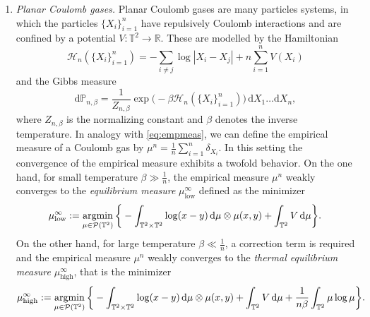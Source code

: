 \documentclass[11pt,a4paper,oneside]{amsart}
\numberwithin{equation}{section}
\begin{document}
\begin{enumerate}
%

\medskip
\item \emph{Planar Coulomb gases. }Planar Coulomb gases are many  particles systems, in which the particles $\{X_i\}_{i=1}^n$ have repulsively Coulomb interactions and are confined by a potential $V: \mathbb{T}^2 \rightarrow \mathbb{R}$. These are modelled by the Hamiltonian
\begin{equation}\label{eq:hamiltonian}
\mathcal{H}_n(\{X_i\}_{i=1}^n) = - \sum_{i \neq j} \log |X_i - X_j| + n \sum_{i=1}^n V(X_i)
\end{equation}
and the Gibbs measure
\begin{equation}\label{eq:gibbsmeasure}
\mathrm{d}\mathbb{P}_{n, \beta} = \frac 1{Z_{n,\beta}} \exp\big(- \beta \mathcal{H}_n  (\{X_i\}_{i=1}^n)\big)\, \mathrm{d}X_1 \dots \mathrm{d}X_n,
\end{equation}
where $Z_{n,\beta}$ is the normalizing constant and $\beta$ denotes the inverse temperature.  In analogy with \eqref{eq:empmeas}, we can define the empirical measure of a Coulomb gas by $\mu^n = \frac1n \sum_{i=1}^n \delta_{X_i}$. In this setting the convergence of the empirical measure exhibits a twofold behavior.  On the one hand, for small temperature $\beta \gg \frac1n$, the empirical measure $\mu^n$ weakly converges to the \emph{equilibrium measure} $\mu^\infty_{\text{low}}$ defined as the minimizer
%
$$\mu^\infty_{\text{low}} := \operatornamewithlimits{argmin}_{\mu \in \mathcal{P}(\mathbb{T}^2)} \bigg\{ - \int_{\mathbb{T}^2\times \mathbb{T}^2} \log (x-y) \,\mathrm{d}\mu \otimes \mu (x,y) + \int_{\mathbb{T}^2} V \,\mathrm{d}\mu\bigg\}. $$
%
On the other hand, for large temperature $\beta\ll \frac{1}{n}$, a correction term is required and the empirical measure $\mu^n$ weakly converges to the \emph{thermal equilibrium measure} $\mu^\infty_{\text{high}}$, that is the minimizer
%
\begin{equation*}
%
\mu^\infty_{\text{high}} :=\operatornamewithlimits{argmin}_{\mu \in \mathcal{P}(\mathbb{T}^2)} \bigg\{- \int_{\mathbb{T}^2\times \mathbb{T}^2} \log (x-y) \,\mathrm{d}\mu \otimes \mu (x,y) + \int_{\mathbb{T}^2} V \,\mathrm{d}\mu + \frac 1{n \beta} \int_{\mathbb{T}^2} \mu \log \mu\bigg\}.

\end{equation*}
\end{enumerate}
\end{document}
